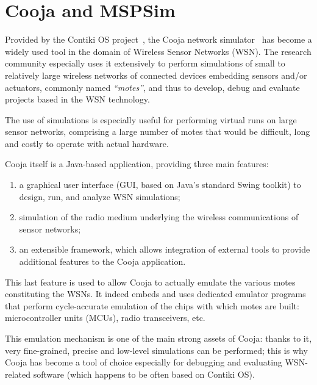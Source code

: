 \documentclass[10pt,emptycopyrightspace]{ewsn-proc}
\begin{document}
\medskip


\section{Cooja and MSPSim}
\label{coojaMspsim}

Provided by the Contiki OS project~\cite{ContikiOS}, the Cooja network
simulator~\cite{Cooja} has become a widely used tool in the domain of
Wireless Sensor Networks (WSN). The research community especially uses
it extensively to perform simulations of small to relatively large wireless
networks of connected devices embedding sensors and/or actuators, commonly
named \emph{``motes''}, and thus to develop, debug and evaluate projects
based in the WSN technology.

The use of simulations is especially useful for performing virtual runs
on large sensor networks, comprising a large number of motes that would
be difficult, long and costly to operate with actual hardware.

\medskip

Cooja itself is a Java-based application, providing three main features:
\begin{enumerate}
\item a graphical user interface (GUI, based on Java's standard Swing toolkit)
to design, run, and analyze WSN simulations;
\item simulation of the radio medium underlying the wireless communications
of sensor networks;
\item an extensible framework, which allows integration of external tools
to provide additional features to the Cooja application.
\end{enumerate}

\medskip

This last feature is used to allow Cooja to actually emulate the various
motes constituting the WSNs. It indeed embeds and uses dedicated emulator
programs that perform cycle-accurate emulation of the chips with which motes
are built: microcontroller units (MCUs), radio transceivers, etc.

This emulation mechanism is one of the main strong assets of Cooja:
thanks to it, very fine-grained, precise and low-level simulations
can be performed; this is why Cooja has become a tool of choice especially
for debugging and evaluating WSN-related software (which happens to be
often based on Contiki OS).
\end{document}
